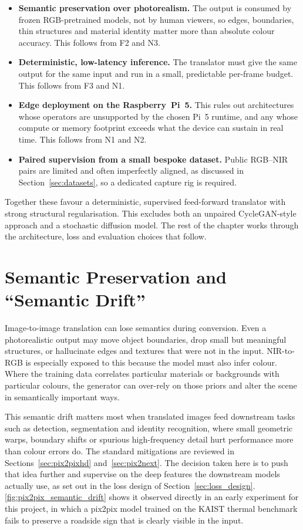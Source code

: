 \begin{itemize}
    \item \textbf{Semantic preservation over photorealism.} The output is consumed by frozen RGB-pretrained models, not by human viewers, so edges, boundaries, thin structures and material identity matter more than absolute colour accuracy. This follows from F2 and N3.
    \item \textbf{Deterministic, low-latency inference.} The translator must give the same output for the same input and run in a small, predictable per-frame budget. This follows from F3 and N1.
    \item \textbf{Edge deployment on the Raspberry~Pi~5.} This rules out architectures whose operators are unsupported by the chosen Pi~5 runtime, and any whose compute or memory footprint exceeds what the device can sustain in real time. This follows from N1 and N2.
    \item \textbf{Paired supervision from a small bespoke dataset.} Public RGB--NIR pairs are limited and often imperfectly aligned, as discussed in Section~\ref{sec:datasets}, so a dedicated capture rig is required.
\end{itemize}

Together these favour a deterministic, supervised feed-forward translator with strong structural regularisation. This excludes both an unpaired CycleGAN-style approach and a stochastic diffusion model. The rest of the chapter works through the architecture, loss and evaluation choices that follow.

\section{Semantic Preservation and ``Semantic Drift''}
\label{sec:semantic_drift}

Image-to-image translation can lose semantics during conversion. Even a photorealistic output may move object boundaries, drop small but meaningful structures, or hallucinate edges and textures that were not in the input. NIR-to-RGB is especially exposed to this because the model must also infer colour. Where the training data correlates particular materials or backgrounds with particular colours, the generator can over-rely on those priors and alter the scene in semantically important ways.

This semantic drift matters most when translated images feed downstream tasks such as detection, segmentation and identity recognition, where small geometric warps, boundary shifts or spurious high-frequency detail hurt performance more than colour errors do. The standard mitigations are reviewed in Sections~\ref{sec:pix2pixhd} and~\ref{sec:pix2next}. The decision taken here is to push that idea further and supervise on the deep features the downstream models actually use, as set out in the loss design of Section~\ref{sec:loss_design}.  \autoref{fig:pix2pix_semantic_drift} shows it observed directly in an early experiment for this project, in which a pix2pix model trained on the KAIST thermal benchmark fails to preserve a roadside sign that is clearly visible in the input.

